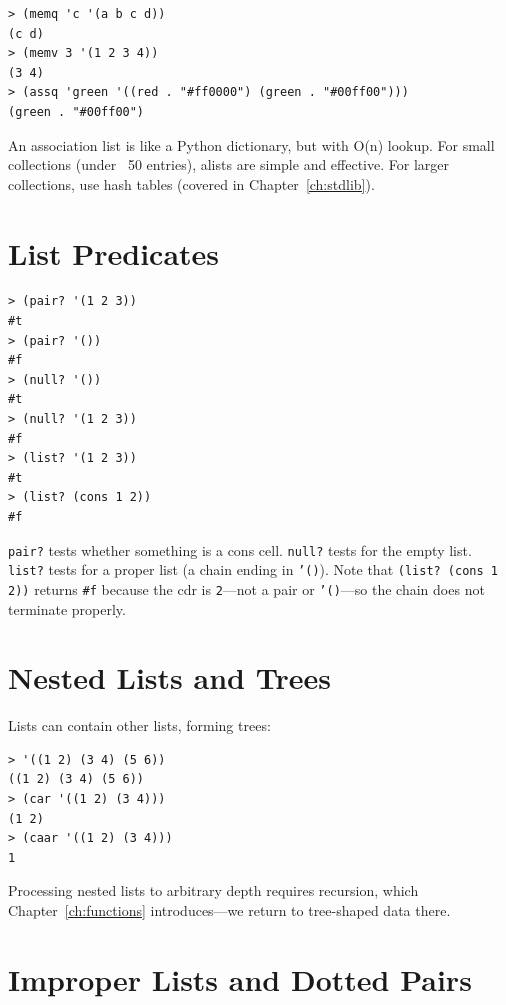 \begin{lstlisting}[style=repl]
> (memq 'c '(a b c d))
(c d)
> (memv 3 '(1 2 3 4))
(3 4)
> (assq 'green '((red . "#ff0000") (green . "#00ff00")))
(green . "#00ff00")
\end{lstlisting}

\begin{note}
An association list is like a Python dictionary, but with O(n) lookup. For small collections (under ~50 entries), alists are simple and effective. For larger collections, use hash tables (covered in Chapter~\ref{ch:stdlib}).
\end{note}

\section{List Predicates}

\begin{lstlisting}[style=repl]
> (pair? '(1 2 3))
#t
> (pair? '())
#f
> (null? '())
#t
> (null? '(1 2 3))
#f
> (list? '(1 2 3))
#t
> (list? (cons 1 2))
#f
\end{lstlisting}

\texttt{pair?} tests whether something is a cons cell. \texttt{null?} tests for the empty list. \texttt{list?} tests for a proper list (a chain ending in \texttt{'()}). Note that \texttt{(list? (cons 1 2))} returns \texttt{\#f} because the cdr is \texttt{2}---not a pair or \texttt{'()}---so the chain does not terminate properly.

\section{Nested Lists and Trees}

Lists can contain other lists, forming trees:

\begin{lstlisting}[style=repl]
> '((1 2) (3 4) (5 6))
((1 2) (3 4) (5 6))
> (car '((1 2) (3 4)))
(1 2)
> (caar '((1 2) (3 4)))
1
\end{lstlisting}

Processing nested lists to arbitrary depth requires recursion, which Chapter~\ref{ch:functions} introduces---we return to tree-shaped data there.

\section{Improper Lists and Dotted Pairs}

